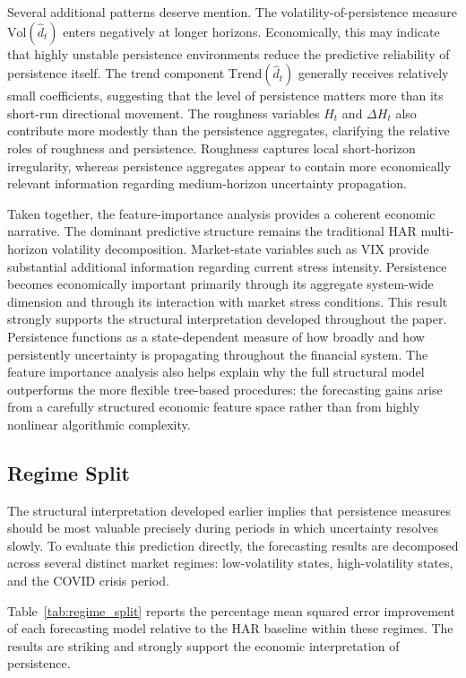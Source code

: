 \documentclass[unnumsec,webpdf,contemporary,large]{oup-authoring-template}%
\theoremstyle{thmstyleone}%
\theoremstyle{thmstyletwo}%
\theoremstyle{thmstylethree}%
\begin{document}
Several additional patterns deserve mention. The volatility-of-persistence
measure $\mathrm{Vol}( \hat{d}_t)$ enters negatively at longer horizons.
Economically, this may indicate that highly unstable persistence
environments reduce the predictive reliability of persistence itself. The
trend component $\mathrm{Trend}( \hat{d}_t)$ generally receives relatively
small coefficients, suggesting that the level of persistence matters more
than its short-run directional movement. The roughness variables $H_t$ and
$\Delta H_t$ also contribute more modestly than the persistence aggregates,
clarifying the relative roles of roughness and persistence. Roughness
captures local short-horizon irregularity, whereas persistence aggregates
appear to contain more economically relevant information regarding
medium-horizon uncertainty propagation.

Taken together, the feature-importance analysis provides a coherent
economic narrative. The dominant predictive structure remains the
traditional HAR multi-horizon volatility decomposition. Market-state
variables such as VIX provide substantial additional information regarding
current stress intensity. Persistence becomes economically important
primarily through its aggregate system-wide dimension and through its
interaction with market stress conditions. This result strongly supports
the structural interpretation developed throughout the paper. Persistence
functions as a state-dependent measure of how broadly and how persistently
uncertainty is propagating throughout the financial system. The feature
importance analysis also helps explain why the full structural model
outperforms the more flexible tree-based procedures: the forecasting gains
arise from a carefully structured economic feature space rather than from
highly nonlinear algorithmic complexity.



\subsection{Regime Split}
\label{subsec:regimes}

The structural interpretation developed earlier implies that persistence
measures should be most valuable precisely during periods in which
uncertainty resolves slowly. To evaluate this prediction directly, the
forecasting results are decomposed across several distinct market regimes:
low-volatility states, high-volatility states, and the COVID crisis period.

Table~\ref{tab:regime_split} reports the percentage mean squared error
improvement of each forecasting model relative to the HAR baseline within
these regimes. The results are striking and strongly support the economic
interpretation of persistence.
\end{document}
